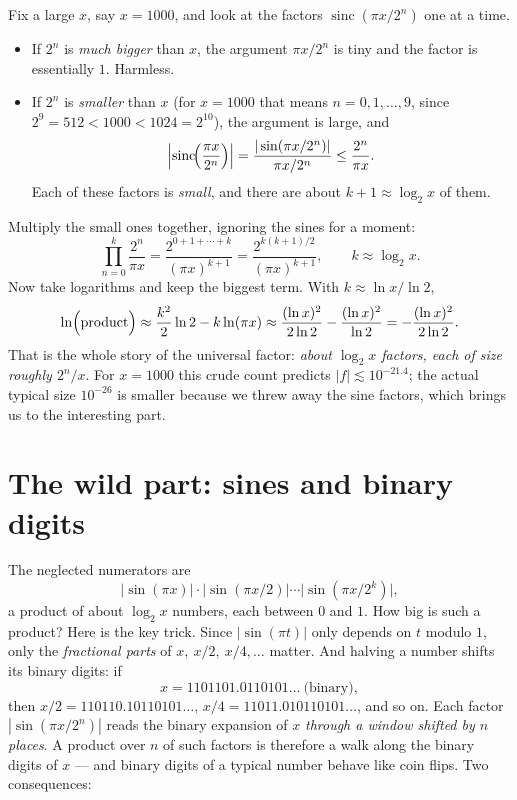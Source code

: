 \documentclass[11pt,oneside]{article}
\theoremstyle{remark}
\newcommand{\sinc}{\operatorname{sinc}}
\begin{document}
Fix a large $x$, say $x=1000$, and look at the factors
$\sinc(\pi x/2^n)$ one at a time.

\begin{itemize}
\item If $2^n$ is \emph{much bigger} than $x$, the argument
$\pi x/2^n$ is tiny and the factor is essentially $1$.  Harmless.
\item If $2^n$ is \emph{smaller} than $x$ (for $x=1000$ that means
$n=0,1,\dots,9$, since $2^9=512<1000<1024=2^{10}$), the argument is
large, and
\[
 \Bigl|\sinc\!\Bigl(\frac{\pi x}{2^n}\Bigr)\Bigr|
 =\frac{|\sin(\pi x/2^n)|}{\pi x/2^n}
 \le\frac{2^n}{\pi x}.
\]
Each of these factors is \emph{small}, and there are about
$k+1\approx\log_2x$ of them.
\end{itemize}
Multiply the small ones together, ignoring the sines for a moment:
\[
 \prod_{n=0}^{k}\frac{2^n}{\pi x}
 =\frac{2^{0+1+\cdots+k}}{(\pi x)^{k+1}}
 =\frac{2^{k(k+1)/2}}{(\pi x)^{k+1}},
 \qquad k\approx\log_2 x .
\]
Now take logarithms and keep the biggest term.  With
$k\approx\ln x/\ln2$,
\[
 \ln\Bigl(\text{product}\Bigr)
 \approx\frac{k^2}{2}\ln 2-k\ln(\pi x)
 \approx\frac{(\ln x)^2}{2\ln2}-\frac{(\ln x)^2}{\ln 2}
 =-\frac{(\ln x)^2}{2\ln 2}.
\]
That is the whole story of the universal factor: \emph{about
$\log_2x$ factors, each of size roughly $2^n/x$}.  For $x=1000$ this
crude count predicts $|f|\lesssim10^{-21.4}$; the actual typical size
$10^{-26}$ is smaller because we threw away the sine factors, which
brings us to the interesting part.

\section{The wild part: sines and binary digits}

The neglected numerators are
\[
 \bigl|\sin(\pi x)\bigr|\cdot
 \bigl|\sin(\pi x/2)\bigr|\cdots
 \bigl|\sin(\pi x/2^k)\bigr| ,
\]
a product of about $\log_2x$ numbers, each between $0$ and $1$.  How
big is such a product?  Here is the key trick.  Since
$|\sin(\pi t)|$ only depends on $t$ modulo $1$, only the
\emph{fractional parts} of $x,\ x/2,\ x/4,\dots$ matter.  And halving
a number shifts its binary digits: if
\[
 x=1101101.0110101\ldots\ \text{(binary)},
\]
then $x/2=110110.10110101\ldots$, $x/4=11011.010110101\ldots$, and so
on.  Each factor $|\sin(\pi x/2^n)|$ reads the binary expansion of $x$
\emph{through a window shifted by $n$ places}.  A product over $n$ of
such factors is therefore a walk along the binary digits of $x$ ---
and binary digits of a typical number behave like coin flips.  Two
consequences:
\end{document}
